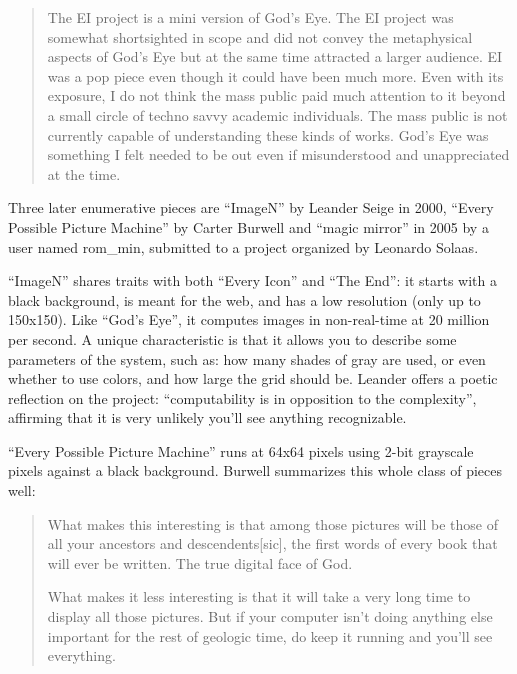 \documentclass{thesis}
\begin{document}
	\begin{quote}
	The EI project is a mini version of God's Eye. The EI project was somewhat shortsighted in scope and did not convey the metaphysical aspects of God's Eye but at the same time attracted a larger audience. EI was a pop piece even though it could have been much more. Even with its exposure, I do not think the mass public paid much attention to it beyond a small circle of techno savvy academic individuals. The mass public is not currently capable of understanding these kinds of works. God's Eye was something I felt needed to be out even if misunderstood and unappreciated at the time.
	\end{quote}
	
	Three later enumerative pieces are ``ImageN'' by Leander Seige in 2000\cite{leander_seige_imagen_????}, ``Every Possible Picture Machine'' by Carter Burwell\cite{carter_burwell_every_????} and ``magic mirror'' in 2005 by a user named rom\_min\cite{leonardo_solaas_magic_????}, submitted to a project organized by Leonardo Solaas.
	
	``ImageN'' shares traits with both ``Every Icon'' and ``The End'': it starts with a black background, is meant for the web, and has a low resolution (only up to 150x150). Like ``God's Eye'', it computes images in non-real-time at 20 million per second. A unique characteristic is that it allows you to describe some parameters of the system, such as: how many shades of gray are used, or even whether to use colors, and how large the grid should be. Leander offers a poetic reflection on the project: ``computability is in opposition to the complexity'', affirming that it is very unlikely you'll see anything recognizable.
	
	``Every Possible Picture Machine'' runs at 64x64 pixels using 2-bit grayscale pixels against a black background. Burwell summarizes this whole class of pieces well:
	
	\begin{quote}
	What makes this interesting is that among those pictures will be those of all your ancestors and descendents[sic], the first words of every book that will ever be written. The true digital face of God.

	What makes it less interesting is that it will take a very long time to display all those pictures. But if your computer isn't doing anything else important for the rest of geologic time, do keep it running and you'll see everything.
	\end{quote}
	
\end{document}
